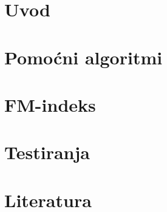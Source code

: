 \documentclass[pdftex,12pt,a4paper]{report}
\begin{document}


\tableofcontents

\chapter{Uvod}


\chapter{Pomoćni algoritmi}


\chapter{FM-indeks}


\chapter{Testiranja}


\chapter{Literatura}

%

% 
\end{document}
